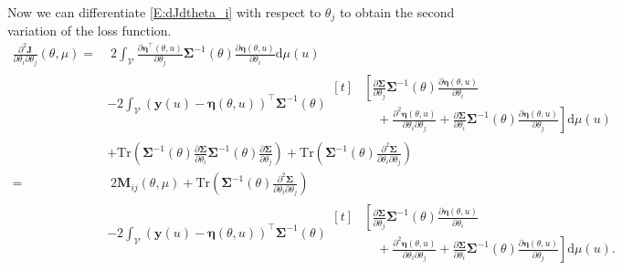 \documentclass[a4paper]{article}
\theoremstyle{definition}
\theoremstyle{remark}
\newcommand{\diff}{\mathrm{d}}
\newcommand{\Tr}{\mathrm{Tr}}
\newcommand{\V}{\mathcal{V}}
\newcommand{\yb}{\mathbf{y}}
\newcommand{\Jb}{\mathbf{J}}
\newcommand{\Mb}{\mathbf{M}}
\newcommand{\etab}{\boldsymbol{\eta}}
\newcommand{\Sigmab}{\boldsymbol{\Sigma}}
\begin{document}
Now we can differentiate \eqref{E:dJdtheta_i} with respect to $\theta_j$ to obtain the second variation of the loss function.
\begin{equation}
\begin{aligned}
\frac{\partial^2 \Jb}{\partial\theta_i\partial\theta_j}(\theta,\mu)
=&\;
2\int_\V
\frac{\partial\etab^\top(\theta,u) }{\partial \theta_j}
\Sigmab^{-1}(\theta)
\frac{\partial\etab(\theta,u)}{\partial \theta_i}\diff \mu(u)
\\&
-2\int_\V
(\yb(u)-\etab(\theta,u))^\top 
\Sigmab^{-1}(\theta)
\begin{aligned}[t]
&\displaystyle
\left[\frac{\partial \Sigmab}{\partial\theta_j}\Sigmab^{-1}(\theta)
\frac{\partial\etab(\theta,u)}{\partial \theta_i}\right.
\\
&\displaystyle
\left.\quad
+
\frac{\partial^2\etab(\theta,u)}{\partial \theta_i\partial \theta_j}
+
\frac{\partial \Sigmab}{\partial\theta_i}\Sigmab^{-1}(\theta)
\frac{\partial\etab(\theta,u)}{\partial \theta_j}
\right]\diff \mu(u)
\end{aligned}
\\&
+
\Tr\left(\Sigmab^{-1}(\theta) \frac{\partial \Sigmab}{\partial\theta_i}\Sigmab^{-1}(\theta) \frac{\partial \Sigmab}{\partial\theta_j}\right)
+
\Tr\left(\Sigmab^{-1}(\theta) \frac{\partial^2 \Sigmab}{\partial\theta_i\partial\theta_j}\right)
\\
=&\;
2 \Mb_{ij}(\theta,\mu)
+
\Tr\left(\Sigmab^{-1}(\theta) \frac{\partial^2 \Sigmab}{\partial\theta_i\partial\theta_j}\right)
\\
&
-2\int_\V
(\yb(u)-\etab(\theta,u))^\top 
\Sigmab^{-1}(\theta)
\begin{aligned}[t]
&\displaystyle
\left[\frac{\partial \Sigmab}{\partial\theta_j}\Sigmab^{-1}(\theta)
\frac{\partial\etab(\theta,u)}{\partial \theta_i}\right.
\\
&\displaystyle
\left.\quad
+
\frac{\partial^2\etab(\theta,u)}{\partial \theta_i\partial \theta_j}
+
\frac{\partial \Sigmab}{\partial\theta_i}\Sigmab^{-1}(\theta)
\frac{\partial\etab(\theta,u)}{\partial \theta_j}
\right]\diff \mu(u).
\end{aligned}
\end{aligned}
\end{equation}
\end{document}
